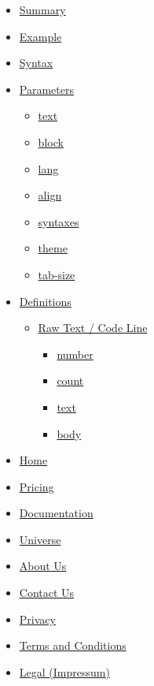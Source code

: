 \begin{itemize}
\tightlist
\item
  \hyperref[summary]{Summary}
\item
  \hyperref[example]{Example}
\item
  \hyperref[syntax]{Syntax}
\item
  \hyperref[parameters]{Parameters}

  \begin{itemize}
  \tightlist
  \item
    \hyperref[parameters-text]{text}
  \item
    \hyperref[parameters-block]{block}
  \item
    \hyperref[parameters-lang]{lang}
  \item
    \hyperref[parameters-align]{align}
  \item
    \hyperref[parameters-syntaxes]{syntaxes}
  \item
    \hyperref[parameters-theme]{theme}
  \item
    \hyperref[parameters-tab-size]{tab-size}
  \end{itemize}
\item
  \hyperref[definitions]{Definitions}

  \begin{itemize}
  \tightlist
  \item
    \hyperref[definitions-line]{Raw Text / Code Line}

    \begin{itemize}
    \tightlist
    \item
      \hyperref[definitions-line-number]{number}
    \item
      \hyperref[definitions-line-count]{count}
    \item
      \hyperref[definitions-line-text]{text}
    \item
      \hyperref[definitions-line-body]{body}
    \end{itemize}
  \end{itemize}
\end{itemize}

\begin{itemize}
\tightlist
\item
  \href{/}{Home}
\item
  \href{/pricing/}{Pricing}
\item
  \href{/docs/}{Documentation}
\item
  \href{/universe/}{Universe}
\item
  \href{/about/}{About Us}
\item
  \href{/contact/}{Contact Us}
\item
  \href{/privacy/}{Privacy}
\item
  \href{https://typst.app/terms}{Terms and Conditions}
\item
  \href{/legal/}{Legal (Impressum)}
\end{itemize}

